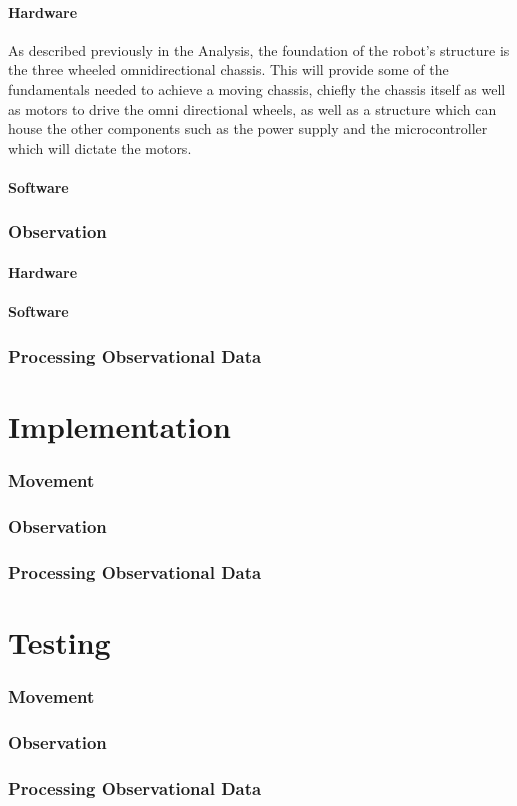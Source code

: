 			\subsubsection{Hardware}
			As described previously in the Analysis, the foundation of the robot's structure is the three wheeled omnidirectional chassis. This will provide some of the fundamentals needed to achieve a moving chassis, chiefly the chassis itself as well as motors to drive the omni directional wheels, as well as a structure which can house the other components such as the power supply and the microcontroller which will dictate the motors.
			
			\subsubsection{Software}
		
		
		\subsection{Observation}
			\subsubsection{Hardware}
			\subsubsection{Software}
		
		\subsection{Processing Observational Data}
		
		
	\chapter{Implementation}
		\subsection{Movement}
		\subsection{Observation}
		\subsection{Processing Observational Data}
		
	\chapter{Testing}
		\subsection{Movement}
		\subsection{Observation}
		\subsection{Processing Observational Data}